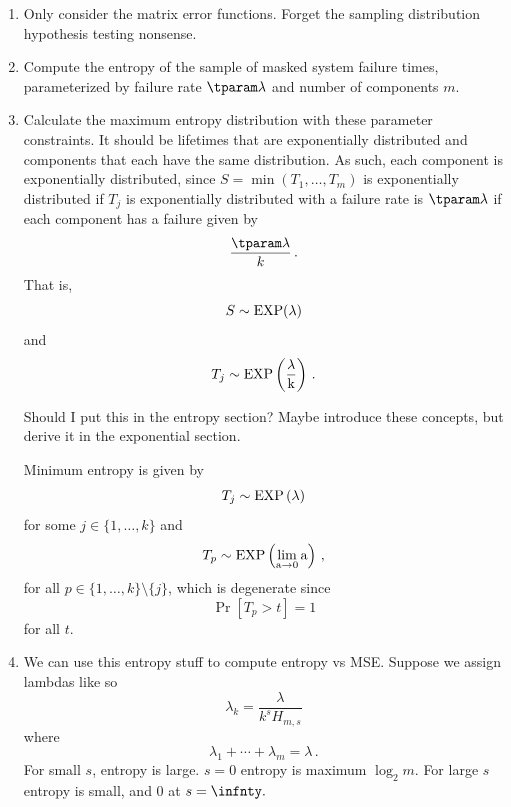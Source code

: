 \documentclass[hidelinks,11pt]{article}
\newcommand{\harmonic}[2]{H_{#1,#2}}
\begin{document}
\begin{enumerate}
    \item Only consider the matrix error functions. Forget the sampling distribution hypothesis testing nonsense.
    \item Compute the entropy of the sample of masked system failure times, parameterized by failure rate $\tparam\lambda$ and number of components $m$.
    \item Calculate the maximum entropy distribution with these parameter constraints. It should be lifetimes that are exponentially distributed and components that each have the same distribution. As such, each component is exponentially distributed, since $S = \min(T_1, \ldots, T_m)$ is exponentially distributed if $T_j$ is exponentially distributed with a failure rate is $\tparam\lambda$ if each component has a failure given by
    \begin{equation}
        \frac{\tparam\lambda}{k}\,.
    \end{equation}
    That is,
    \begin{equation}
        S \sim \rm{EXP}(\lambda)
    \end{equation}
    and
    \begin{equation}
        T_j \sim \rm{EXP}\left(\frac{\lambda}{k}\right)\,.
    \end{equation}
    
    Should I put this in the entropy section? Maybe introduce these concepts, but derive it in the exponential section.
    
    Minimum entropy is given by
    \begin{equation}
        T_j \sim \rm{EXP}\left(\lambda\right)
    \end{equation}
    for some $j \in \{1,\ldots,k\}$ and
    \begin{equation}
        T_p \sim \rm{EXP}\left(\lim_{a \to 0} a\right)\,,
    \end{equation}
    for all $p \in \{1,\ldots,k\} \setminus \{ j \}$, which is degenerate since
    \begin{equation}
        \Pr[T_p > t] = 1
    \end{equation}
    for all $t$.
    
    \item We can use this entropy stuff to compute entropy vs MSE.
    Suppose we assign lambdas like so
    \begin{equation}
        \lambda_k = \frac{\lambda}{k^s \harmonic{m}{s}}
    \end{equation}
    where
    \begin{equation}
        \lambda_1 + \cdots + \lambda_m = \lambda\,.
    \end{equation}
    For small $s$, entropy is large. $s=0$ entropy is maximum $\log_2 m$. For large $s$ entropy is small, and $0$ at $s=\infnty.$
    

\end{enumerate}
\end{document}
